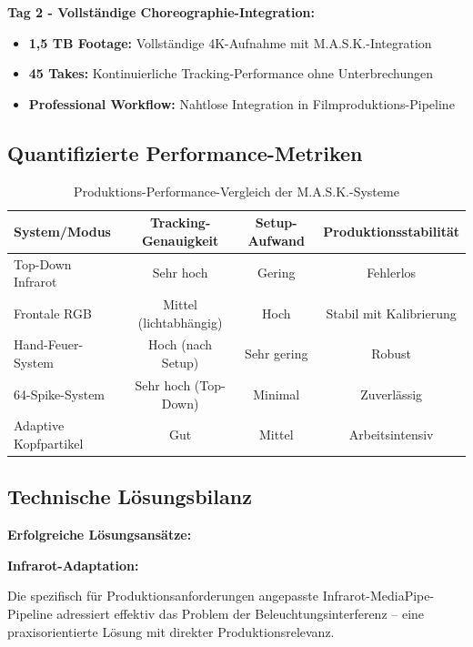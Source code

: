 \textbf{Tag 2 - Vollständige Choreographie-Integration:}
\begin{itemize}
    \item \textbf{1,5 TB Footage:} Vollständige 4K-Aufnahme mit M.A.S.K.-Integration
    \item \textbf{45 Takes:} Kontinuierliche Tracking-Performance ohne Unterbrechungen
    \item \textbf{Professional Workflow:} Nahtlose Integration in Filmproduktions-Pipeline
\end{itemize}

\newpage

\subsection{Quantifizierte Performance-Metriken}

\begin{table}[H]
    \centering
    \begin{tabular}{|l|c|c|c|}
        \hline
        \textbf{System/Modus} & \textbf{Tracking-Genauigkeit} & \textbf{Setup-Aufwand} & \textbf{Produktionsstabilität} \\ \hline
        Top-Down Infrarot & Sehr hoch & Gering & Fehlerlos \\ \hline
        Frontale RGB & Mittel (lichtabhängig) & Hoch & Stabil mit Kalibrierung \\ \hline
        Hand-Feuer-System & Hoch (nach Setup) & Sehr gering & Robust \\ \hline
        64-Spike-System & Sehr hoch (Top-Down) & Minimal & Zuverlässig \\ \hline
        Adaptive Kopfpartikel & Gut & Mittel & Arbeitsintensiv \\ \hline
    \end{tabular}
    \caption{Produktions-Performance-Vergleich der M.A.S.K.-Systeme}
    \label{tab:production_performance}
\end{table}

\subsection{Technische Lösungsbilanz}

\textbf{Erfolgreiche Lösungsansätze:}

\textbf{Infrarot-Adaptation:} \raggedright Die spezifisch für Produktionsanforderungen angepasste Infrarot-MediaPipe-Pipeline adressiert effektiv das Problem der Beleuchtungsinterferenz – eine praxisorientierte Lösung mit direkter Produktionsrelevanz.

